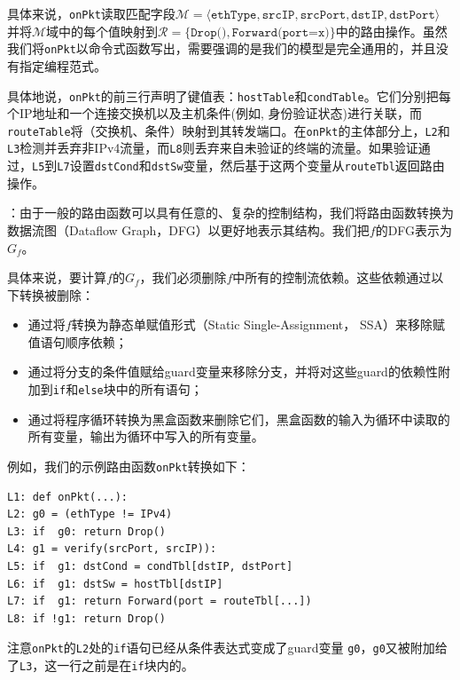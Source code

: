 \documentclass{ctexart}
\newcommand{\para}[1]{\smallskip\noindent {\bf #1}}
\begin{document}
具体来说，\texttt{onPkt}读取匹配字段$\mathcal{M} = \langle \texttt{ethType}, \texttt{srcIP}, \texttt{srcPort}, \texttt{dstIP}, \texttt{dstPort} \rangle$ 并将$\mathcal{M}$域中的每个值映射到$\mathcal{R}=\{\texttt{Drop()}, \texttt{Forward(port=x)} \}$中的路由操作。虽然我们将\texttt{onPkt}以命令式函数写出，需要强调的是我们的模型是完全通用的，并且没有指定编程范式。

具体地说，\texttt{onPkt}的前三行声明了键值表：\texttt{hostTable}和\texttt{condTable}。它们分别把每个IP地址和一个连接交换机以及主机条件(例如, 身份验证状态)进行关联，而\texttt{routeTable}将（交换机、条件）映射到其转发端口。在\texttt{onPkt}的主体部分上，\texttt{L2}和\texttt{L3}检测并丢弃非IPv4流量，而\texttt{L8}则丢弃来自未验证的终端的流量。如果验证通过，\texttt{L5}到\texttt{L7}设置\texttt{dstCond}和\texttt{dstSw}变量，然后基于这两个变量从\texttt{routeTbl}返回路由操作。



\para{路由函数数据流图}：由于一般的路由函数可以具有任意的、复杂的控制结构，我们将路由函数转换为数据流图（Dataflow Graph，DFG）以更好地表示其结构。我们把$f$的DFG表示为$G_f$。

具体来说，要计算$f$的$G_f$，我们必须删除$f$中所有的控制流依赖。这些依赖通过以下转换被删除：

\begin{itemize}
  \item 通过将$f$转换为静态单赋值形式（Static Single-Assignment， SSA）来移除赋值语句顺序依赖；
  \item 通过将分支的条件值赋给guard变量来移除分支，并将对这些guard的依赖性附加到\texttt{if}和\texttt{else}块中的所有语句；
  \item 通过将程序循环转换为黑盒函数来删除它们，黑盒函数的输入为循环中读取的所有变量，输出为循环中写入的所有变量。
\end{itemize}

例如，我们的示例路由函数\texttt{onPkt}转换如下：

\begin{verbatim}
L1: def onPkt(...):
L2: g0 = (ethType != IPv4)
L3: if  g0: return Drop()
L4: g1 = verify(srcPort, srcIP)):
L5: if  g1: dstCond = condTbl[dstIP, dstPort]
L6: if  g1: dstSw = hostTbl[dstIP]
L7: if  g1: return Forward(port = routeTbl[...])
L8: if !g1: return Drop()
\end{verbatim}

注意\texttt{onPkt}的\texttt{L2}处的\texttt{if}语句已经从条件表达式变成了guard变量 \texttt{g0}，\texttt{g0}又被附加给了\texttt{L3}，这一行之前是在\texttt{if}块内的。
\end{document}
